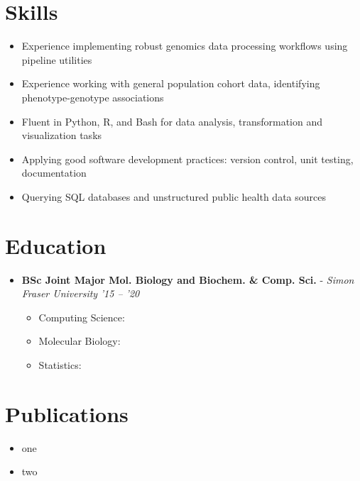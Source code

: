 \documentclass{article}
\newcommand{\customitem}{\item[] \hspace{-.85cm}}
\newcommand{\experienceheader}[3]{\customitem \textbf{#1} - \textit{#2} \hfill \textit{#3}}
\newcommand{\customsection}[1]{\section*{#1} \vspace{-.3cm} \hrulefill}
\begin{document}
\customsection{Skills}
\begin{itemize}
  \customitem Experience implementing robust genomics data processing workflows using pipeline utilities
  \customitem Experience working with general population cohort data, identifying phenotype-genotype associations
  \customitem Fluent in Python, R, and Bash for data analysis, transformation and visualization tasks
  \customitem Applying good software development practices: version control, unit testing, documentation
  \customitem Querying SQL databases and unstructured public health data sources
\end{itemize}

\customsection{Education}
\begin{itemize}
\experienceheader{BSc Joint Major Mol. Biology and Biochem. \& Comp. Sci.}{Simon Fraser University}{'15 -- '20}
    \begin{itemize}
      \customitem Computing Science:
      \customitem Molecular Biology:
      \customitem Statistics:
    \end{itemize}
\end{itemize}

\customsection{Publications}
\begin{itemize}
  \customitem one
  \customitem two
\end{itemize}
\end{document}
